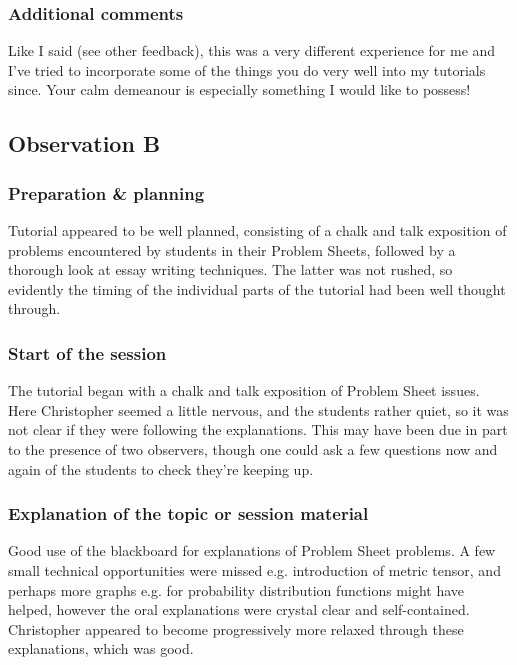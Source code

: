 \subsubsection{Additional comments}

Like I said (see other feedback), this was a very different experience for me and I've tried to incorporate some of the things you do very well into my tutorials since. Your calm demeanour is especially something I would like to possess!


\subsection{Observation B}\label{sec:me-B}

\subsubsection{Preparation \& planning}\label{sec:B-plan}

Tutorial appeared to be well planned, consisting of a chalk and talk exposition of problems encountered by students in their Problem Sheets, followed by a thorough look at essay writing techniques. The latter was not rushed, so evidently the timing of the individual parts of the tutorial had been well thought through.

\subsubsection{Start of the session}\label{sec:B-start}

The tutorial began with a chalk and talk exposition of Problem Sheet issues. Here Christopher seemed a little nervous, and the students rather quiet, so it was not clear if they were following the explanations. This may have been due in part to the presence of two observers, though one could ask a few questions now and again of the students to check they're keeping up.

\subsubsection{Explanation of the topic or session material}\label{sec:B-topic}

Good use of the blackboard for explanations of Problem Sheet problems. A few small technical opportunities were missed e.g. introduction of metric tensor, and perhaps more graphs e.g. for probability distribution functions might have helped, however the oral explanations were crystal clear and self-contained. Christopher appeared to become progressively more relaxed through these explanations, which was good.

